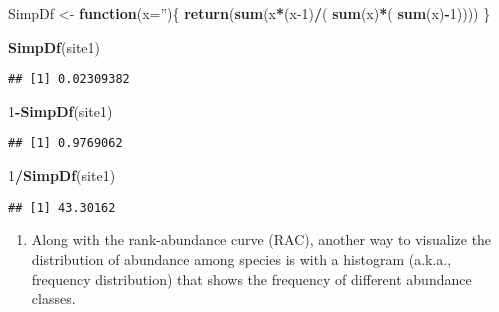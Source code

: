 \documentclass[
]{article}
\newenvironment{Shaded}{\begin{snugshade}}{\end{snugshade}}
\newcommand{\ControlFlowTok}[1]{\textcolor[rgb]{0.13,0.29,0.53}{\textbf{#1}}}
\newcommand{\DataTypeTok}[1]{\textcolor[rgb]{0.13,0.29,0.53}{#1}}
\newcommand{\DecValTok}[1]{\textcolor[rgb]{0.00,0.00,0.81}{#1}}
\newcommand{\KeywordTok}[1]{\textcolor[rgb]{0.13,0.29,0.53}{\textbf{#1}}}
\newcommand{\NormalTok}[1]{#1}
\newcommand{\OperatorTok}[1]{\textcolor[rgb]{0.81,0.36,0.00}{\textbf{#1}}}
\newcommand{\StringTok}[1]{\textcolor[rgb]{0.31,0.60,0.02}{#1}}
\providecommand{\tightlist}{%
  \setlength{\itemsep}{0pt}\setlength{\parskip}{0pt}}
\begin{document}
\begin{Shaded}
\begin{Highlighting}[]
\NormalTok{SimpDf <-}\StringTok{ }\ControlFlowTok{function}\NormalTok{(}\DataTypeTok{x=}\StringTok{''}\NormalTok{)\{}
  \KeywordTok{return}\NormalTok{(}\KeywordTok{sum}\NormalTok{(x}\OperatorTok{*}\NormalTok{(x}\DecValTok{-1}\NormalTok{)}\OperatorTok{/}\NormalTok{( }\KeywordTok{sum}\NormalTok{(x)}\OperatorTok{*}\NormalTok{( }\KeywordTok{sum}\NormalTok{(x)}\OperatorTok{-}\DecValTok{1}\NormalTok{))))}
\NormalTok{\}}
\end{Highlighting}
\end{Shaded}

\begin{Shaded}
\begin{Highlighting}[]
\KeywordTok{SimpDf}\NormalTok{(site1)}
\end{Highlighting}
\end{Shaded}

\begin{verbatim}
## [1] 0.02309382
\end{verbatim}

\begin{Shaded}
\begin{Highlighting}[]
\DecValTok{1}\OperatorTok{-}\KeywordTok{SimpDf}\NormalTok{(site1)}
\end{Highlighting}
\end{Shaded}

\begin{verbatim}
## [1] 0.9769062
\end{verbatim}

\begin{Shaded}
\begin{Highlighting}[]
\DecValTok{1}\OperatorTok{/}\KeywordTok{SimpDf}\NormalTok{(site1)}
\end{Highlighting}
\end{Shaded}

\begin{verbatim}
## [1] 43.30162
\end{verbatim}

\begin{enumerate}
\def\labelenumi{\arabic{enumi}.}
\setcounter{enumi}{1}
\tightlist
\item
  Along with the rank-abundance curve (RAC), another way to visualize
  the distribution of abundance among species is with a histogram
  (a.k.a., frequency distribution) that shows the frequency of different
  abundance classes.
\end{enumerate}
\end{document}
